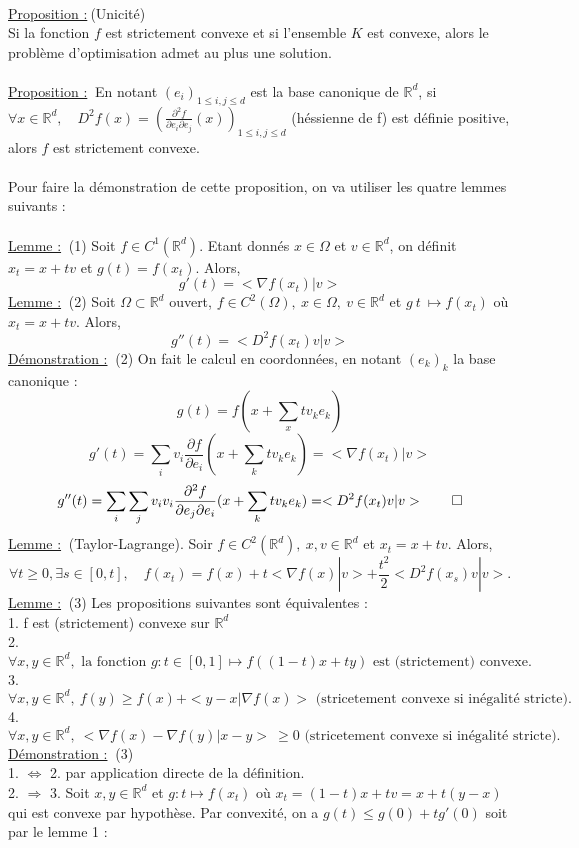 \documentclass[12pt]{article}
\newcommand{\Rd}{\mathbb{R}^d}
\newcommand{\prop}{\underline{Proposition :}}
\newcommand{\demo}{\underline{Démonstration :}}
\newcommand{\lemme}{\underline{Lemme :}}
\begin{document}
\\
\prop $\:$(Unicité) \\
Si la fonction $f$ est strictement convexe et si l'ensemble $K$ est convexe, alors le problème d'optimisation admet au plus une solution.\\
\\
\prop $\:$ En notant $(e_i)_{1\leq i,j\leq d}$ est la base canonique de $\Rd$, si $\forall x \in \Rd, \quad D^2f(x) = (\frac{\partial^2f}{\partial e_i \partial e_j}(x))_{1\leq i,j\leq d}$ (héssienne de f) est définie positive, alors $f$ est strictement convexe.\\
\\
Pour faire la démonstration de cette proposition, on va utiliser les quatre lemmes suivants :\\
\\
\lemme $\:$ (1) Soit $f \in C^1(\Rd).$ Etant donnés $x \in \Omega$ et $v\in\Rd$, on définit $x_t = x + tv$ et $g(t) = f(x_t)$. Alors,
\[
g'(t) = <\nabla f(x_t)|v>
\]
\lemme $\:$ (2) Soit $\Omega \subset \Rd$ ouvert, $f \in C^2(\Omega),\: x \in \Omega, \: v \in \Rd$ et $g\:t\:\mapsto f(x_t)$ où $x_t = x + tv$. Alors,
\[
g''(t) = <D^2f(x_t)v|v>
\]
\demo $\:$ (2) On fait le calcul en coordonnées, en notant $(e_k)_k$ la base canonique :
\[
g(t) = f(x + \sum_xtv_ke_k)
\]
\[
g'(t) = \sum_i v_i\frac{\partial f}{\partial e_i}(x + \sum_ktv_ke_k) = <\nabla f(x_t)|v>
\]
\[
g''(t) = \sum_i\sum_jv_iv_i \frac{\partial^2f}{\partial e_j \partial e_i}(x + \sum_ktv_ke_k) = <D^2f(x_t)v|v> \\
\qed
\]
\lemme $\:$ (Taylor-Lagrange). Soir $f \in C^2(\Rd),\: x, v \in \Rd$ et $x_t = x + tv$. Alors, 
\[
\forall t \geq 0, \exists s \in [0,t],\quad f(x_t) = f(x) + t <\nabla f(x) | v> + \frac{t^2}{2}<D^2f(x_s)v|v>.
\]
\lemme $\:$ (3) Les propositions suivantes sont équivalentes :\\
1. f est (strictement) convexe sur $\Rd$\\
2.
\[
\forall x,y \in \Rd,\text{ la fonction } g : t\in[0,1] \mapsto f((1-t)x + ty) \text{ est (strictement) convexe.}
\]
3.
\[
\forall x,y \in \Rd, \: f(y) \geq f(x) + <y-x|\nabla f(x)> \text{ (stricetement convexe si inégalité stricte).}
\]
4. 
\[
\forall x,y \in \Rd, \: <\nabla f(x) - \nabla f(y)|x-y>\: \geq 0 \text{ (stricetement convexe si inégalité stricte).}
\]
\demo $\:$ (3)\\
1. $\Longleftrightarrow$ 2. par application directe de la définition.\\
2. $\Longrightarrow$ 3. Soit $x,y \in \Rd$ et $g : t \mapsto f(x_t)$ où $x_t = (1-t)x + tv = x + t(y-x)$ qui est convexe par hypothèse. Par convexité, on a $g(t) \leq g(0) + tg'(0)$ soit par le lemme 1 :\\
\end{document}
